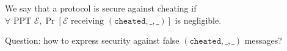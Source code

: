 \begin{definition}
\label{def:cheatsec}
  We say that a protocol is secure against cheating if $\forall \text{ PPT } \mathcal{E},
  \Pr\left[\mathcal{E} \text{ receiving } \left(\mathtt{cheated, \_, \_}\right)\right]$ is
  negligible.
\end{definition}
Question: how to express security against false $\left(\mathtt{cheated, \_, \_}\right)$
messages?
